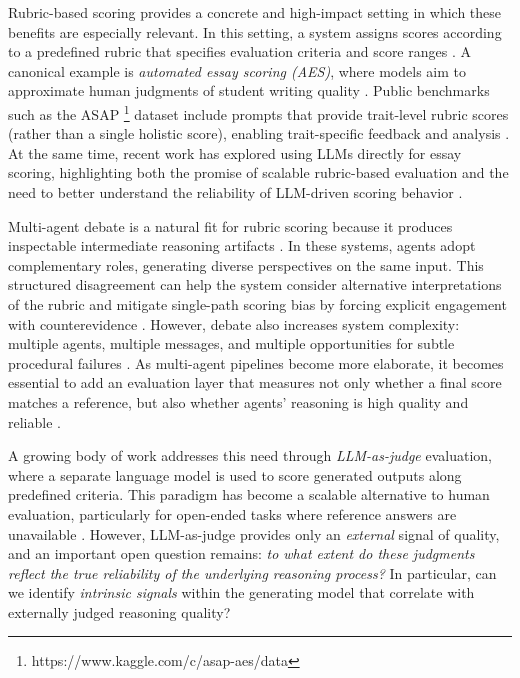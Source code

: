 \documentclass[11pt]{article}
\begin{document}
Rubric-based scoring provides a concrete and high-impact setting in which these benefits are especially relevant. In this setting, a system assigns scores according to a predefined rubric that specifies evaluation criteria and score ranges \cite{10874775}. A canonical example is \emph{automated essay scoring (AES)}, where models aim to approximate human judgments of student writing quality \cite{Dikli_2006}. Public benchmarks such as the ASAP \footnote{https://www.kaggle.com/c/asap-aes/data} dataset include prompts that provide trait-level rubric scores (rather than a single holistic score), enabling trait-specific feedback and analysis \cite{CROSSLEY2025100954}. At the same time, recent work has explored using LLMs directly for essay scoring, highlighting both the promise of scalable rubric-based evaluation and the need to better understand the reliability of LLM-driven scoring behavior \cite{PACK2024100234}.


Multi-agent debate is a natural fit for rubric scoring because it produces inspectable intermediate reasoning artifacts \cite{keramati_2025_17196206}. In these systems, agents adopt complementary roles, generating diverse perspectives on the same input. This structured disagreement can help the system consider alternative interpretations of the rubric and mitigate single-path scoring bias by forcing explicit engagement with counterevidence \cite{du2023improvingfactualityreasoninglanguage}. However, debate also increases system complexity: multiple agents, multiple messages, and multiple opportunities for subtle procedural failures \cite{wynn2025talkisntcheapunderstanding}. As multi-agent pipelines become more elaborate, it becomes essential to add an evaluation layer that measures not only whether a final score matches a reference, but also whether agents' reasoning is high quality and reliable \cite{chen2025multiagentasjudgealigningllmagentbasedautomated}.


A growing body of work addresses this need through \emph{LLM-as-judge} evaluation, where a separate language model is used to score generated outputs along predefined criteria. This paradigm has become a scalable alternative to human evaluation, particularly for open-ended tasks where reference answers are unavailable \cite{zheng2023judging}. However, LLM-as-judge provides only an \emph{external} signal of quality, and an important open question remains: \textit{to what extent do these judgments reflect the true reliability of the underlying reasoning process?} In particular, can we identify \emph{intrinsic signals} within the generating model that correlate with externally judged reasoning quality?
\end{document}
